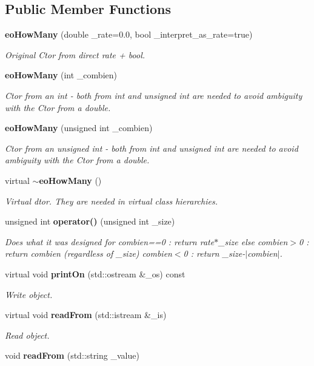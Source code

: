\subsection*{Public Member Functions}
\begin{CompactItemize}
\item 
{\bf eo\-How\-Many} (double \_\-rate=0.0, bool \_\-interpret\_\-as\_\-rate=true)
\begin{CompactList}\small\item\em Original Ctor from direct rate + bool. \item\end{CompactList}\item 
{\bf eo\-How\-Many} (int \_\-combien)\label{classeo_how_many_a1}

\begin{CompactList}\small\item\em Ctor from an int - both from int and unsigned int are needed to avoid ambiguity with the Ctor from a double. \item\end{CompactList}\item 
{\bf eo\-How\-Many} (unsigned int \_\-combien)\label{classeo_how_many_a2}

\begin{CompactList}\small\item\em Ctor from an unsigned int - both from int and unsigned int are needed to avoid ambiguity with the Ctor from a double. \item\end{CompactList}\item 
virtual {\bf $\sim$eo\-How\-Many} ()\label{classeo_how_many_a3}

\begin{CompactList}\small\item\em Virtual dtor. They are needed in virtual class hierarchies. \item\end{CompactList}\item 
unsigned int {\bf operator()} (unsigned int \_\-size)
\begin{CompactList}\small\item\em Does what it was designed for combien==0 : return rate$\ast$\_\-size else combien$>$0 : return combien (regardless of \_\-size) combien$<$0 : return \_\-size-$|$combien$|$. \item\end{CompactList}\item 
virtual void {\bf print\-On} (std::ostream \&\_\-os) const 
\begin{CompactList}\small\item\em Write object. \item\end{CompactList}\item 
virtual void {\bf read\-From} (std::istream \&\_\-is)
\begin{CompactList}\small\item\em Read object. \item\end{CompactList}\item 
void {\bf read\-From} (std::string \_\-value)\label{classeo_how_many_a7}


\end{CompactItemize}

